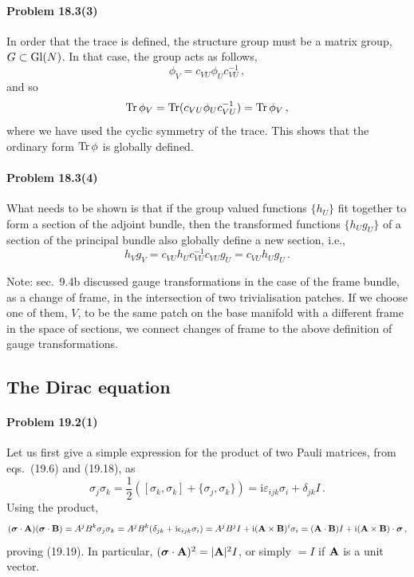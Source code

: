 \documentclass[a4paper,12pt]{article}
\def\imagi{\mathrm{i}}
\def\Tr{\ensuremath{\mathop{\rm Tr}}}
\newcommand{\problem}[1]{\paragraph{Problem #1}}
\begin{document}

\problem{18.3(3)} In order that the trace is defined, the structure group must be a matrix group, $G\subset {\rm Gl}(N)$. In that case, the group acts as follows,
\[
 \phi_V = c_{VU}\phi_U c_{VU}^{-1}\,,
\]
and so
\[
 \Tr\phi_V = \Tr(c_{VU}\phi_U c_{VU}^{-1})=\Tr\phi_V\,,
\]
where we have used the cyclic symmetry of the trace. This shows that the ordinary form $\Tr\phi$ is globally defined.


\problem{18.3(4)} What needs to be shown is that if the group valued functions $\{h_U\}$ fit together to form a section of the adjoint bundle, then the transformed functions $\{h_U g_U\}$ of a section of the principal bundle also globally define a new section, i.e.,
\[
 h_V g_V = c_{VU}h_U c_{VU}^{-1} c_{VU} g_U = c_{VU}h_U g_U\,.
\]

Note: sec.\ 9.4b discussed gauge transformations in the case of the frame bundle, as a change of frame, in the intersection of two trivialisation patches. If we choose one of them, $V$, to be the same patch on the base manifold with a different frame in the space of sections, we connect changes of frame to the above definition of gauge transformations.


\subsection{The Dirac equation}


\problem{19.2(1)} Let us first give a simple expression for the product of two Pauli matrices, from eqs.\ (19.6) and (19.18), as
\[
 \sigma_j \sigma_k = \frac{1}{2}\left([\sigma_k, \sigma_k] + \{\sigma_j, \sigma_k\}\right) = \imagi \varepsilon_{ijk}\sigma_i + \delta_{jk}I\,.
\]
Using the product,
\[
 (\boldsymbol\sigma\cdot{\bf A})(\boldsymbol\sigma\cdot{\bf B})=A^j B^k \sigma_j \sigma_k = A^jB^k(\delta_{jk}+\imagi \epsilon_{ijk}\sigma_i) = A^jB^jI + \imagi({\bf A}\times{\bf B})^i\sigma_i = ({\bf A}\cdot{\bf B})I +\imagi({\bf A}\times{\bf B})\cdot\boldsymbol\sigma\,,
\]
proving (19.19). In particular, $(\boldsymbol\sigma\cdot{\bf A})^2 = |{\bf A}|^2 I$, or simply $=I$ if ${\bf A}$ is a unit vector.
\end{document}
